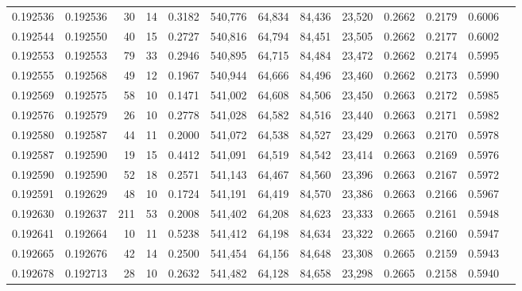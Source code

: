 \begin{tabular}{rrrrrrrrrrrrr}
0.192536 & 0.192536 &    30 &  14 &                                     0.3182 & 540,776 &  64,834 &  84,436 &  23,520 & 0.2662 & 0.2179 & 0.6006 \\
0.192544 & 0.192550 &    40 &  15 &                                     0.2727 & 540,816 &  64,794 &  84,451 &  23,505 & 0.2662 & 0.2177 & 0.6002 \\
0.192553 & 0.192553 &    79 &  33 &                                     0.2946 & 540,895 &  64,715 &  84,484 &  23,472 & 0.2662 & 0.2174 & 0.5995 \\
0.192555 & 0.192568 &    49 &  12 &                                     0.1967 & 540,944 &  64,666 &  84,496 &  23,460 & 0.2662 & 0.2173 & 0.5990 \\
0.192569 & 0.192575 &    58 &  10 &                                     0.1471 & 541,002 &  64,608 &  84,506 &  23,450 & 0.2663 & 0.2172 & 0.5985 \\
0.192576 & 0.192579 &    26 &  10 &                                     0.2778 & 541,028 &  64,582 &  84,516 &  23,440 & 0.2663 & 0.2171 & 0.5982 \\
0.192580 & 0.192587 &    44 &  11 &                                     0.2000 & 541,072 &  64,538 &  84,527 &  23,429 & 0.2663 & 0.2170 & 0.5978 \\
0.192587 & 0.192590 &    19 &  15 &                                     0.4412 & 541,091 &  64,519 &  84,542 &  23,414 & 0.2663 & 0.2169 & 0.5976 \\
0.192590 & 0.192590 &    52 &  18 &                                     0.2571 & 541,143 &  64,467 &  84,560 &  23,396 & 0.2663 & 0.2167 & 0.5972 \\
0.192591 & 0.192629 &    48 &  10 &                                     0.1724 & 541,191 &  64,419 &  84,570 &  23,386 & 0.2663 & 0.2166 & 0.5967 \\
0.192630 & 0.192637 &   211 &  53 &                                     0.2008 & 541,402 &  64,208 &  84,623 &  23,333 & 0.2665 & 0.2161 & 0.5948 \\
0.192641 & 0.192664 &    10 &  11 &                                     0.5238 & 541,412 &  64,198 &  84,634 &  23,322 & 0.2665 & 0.2160 & 0.5947 \\
0.192665 & 0.192676 &    42 &  14 &                                     0.2500 & 541,454 &  64,156 &  84,648 &  23,308 & 0.2665 & 0.2159 & 0.5943 \\
0.192678 & 0.192713 &    28 &  10 &                                     0.2632 & 541,482 &  64,128 &  84,658 &  23,298 & 0.2665 & 0.2158 & 0.5940 \\

\end{tabular}
